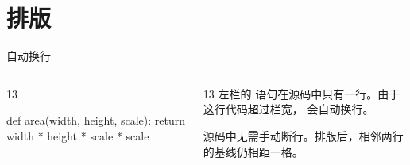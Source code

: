 \documentclass{nbeamer}
\begin{document}
\section{排版}
\begin{frame}[fragile]{自动换行}
\begin{columns}
\begin{column}{13\nbgrid}
\begin{ncode}[language=Python]
def area(width, height, scale):
    return width * height * scale * scale
\end{ncode}
\end{column}%
\hspace{2\nbgrid}%
\begin{column}{13\nbgrid}
左栏的  语句在源码中只有一行。由于这行代码超过栏宽， 会自动换行。

源码中无需手动断行。排版后，相邻两行的基线仍相距一格。
\end{column}
\end{columns}
\end{frame}
\end{document}
